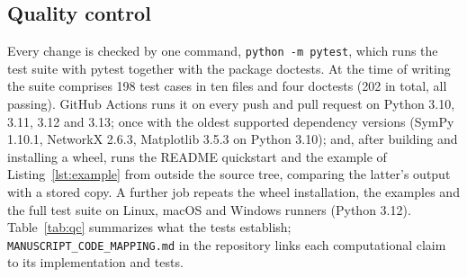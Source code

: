 \documentclass[11pt,a4paper]{article}
\newcommand{\code}[1]{\texttt{#1}}
\begin{document}
\subsection*{Quality control}

Every change is checked by one command, \code{python -m pytest}, which runs the test suite with pytest \cite{pytest} together with the package doctests. At the time of writing the suite comprises 198 test cases in ten files and four doctests (202 in total, all passing). GitHub Actions runs it on every push and pull request on Python 3.10, 3.11, 3.12 and 3.13; once with the oldest supported dependency versions (SymPy 1.10.1, NetworkX 2.6.3, Matplotlib 3.5.3 on Python 3.10); and, after building and installing a wheel, runs the README quickstart and the example of Listing~\ref{lst:example} from outside the source tree, comparing the latter's output with a stored copy. A further job repeats the wheel installation, the examples and the full test suite on Linux, macOS and Windows runners (Python 3.12). Table~\ref{tab:qc} summarizes what the tests establish; \code{MANUSCRIPT\_CODE\_MAPPING.md} in the repository links each computational claim to its implementation and tests.
\end{document}
